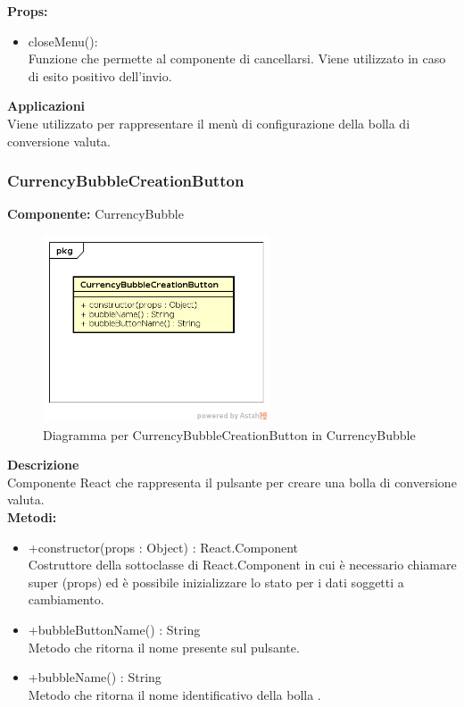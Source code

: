 \textbf{Props:} 
\begin{itemize}
\item closeMenu(): 
\\
Funzione che permette al componente di cancellarsi. Viene utilizzato in caso di esito positivo dell'invio.


\end{itemize} 


\textbf{Applicazioni}\\
Viene utilizzato per rappresentare il menù di configurazione della bolla di conversione valuta. 


\clearpage

\subsubsection{CurrencyBubbleCreationButton}
\textbf{Componente:}  CurrencyBubble\\
   \FloatBarrier
   \begin{figure}[ht]
   \centering
   \includegraphics[width=0.6\textwidth]{img/single-CurrencyBubbleCreationButton.png}
   \caption{{Diagramma per CurrencyBubbleCreationButton in CurrencyBubble}}
\end{figure}
\FloatBarrier
\textbf{Descrizione}\\
Componente React che rappresenta il pulsante per creare una bolla di conversione valuta.
\\
\textbf{Metodi:} 
\begin{itemize}
\item +constructor(props : Object) : React.Component 
\\
Costruttore della sottoclasse di React.Component in cui è necessario chiamare super (props) ed è possibile inizializzare lo stato per i dati soggetti a cambiamento.

\item +bubbleButtonName() : String 
\\
Metodo che ritorna il nome presente sul pulsante.

\item +bubbleName() : String 
\\
Metodo che ritorna il nome identificativo della bolla .

\end{itemize}

